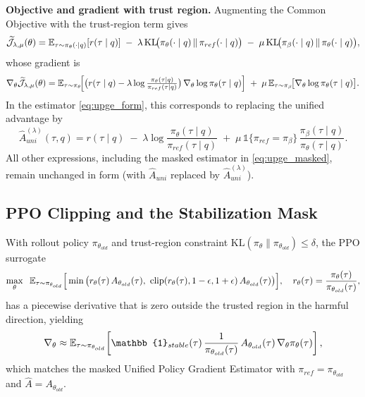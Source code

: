 \medskip
\noindent\textbf{Objective and gradient with trust region.}
Augmenting the Common Objective with the trust-region term gives
\[
\widetilde{\mathcal{J}}_{\lambda,\mu}(\theta)
=
\mathbb{E}_{\tau\sim \pi_\theta(\cdot\mid q)}[r(\tau\mid q)]
\;-\;
\lambda\,\mathrm{KL}\!\big(\pi_\theta(\cdot\mid q)\,\|\,\pi_{ref}(\cdot\mid q)\big)
\;-\;
\mu\,\mathrm{KL}\!\big(\pi_\beta(\cdot\mid q)\,\|\,\pi_\theta(\cdot\mid q)\big),
\]
whose gradient is
\[
\nabla_\theta \widetilde{\mathcal{J}}_{\lambda,\mu}(\theta)
=
\mathbb{E}_{\tau\sim \pi_\theta}\!\Big[\big(r(\tau\mid q)-\lambda \log\tfrac{\pi_\theta(\tau\mid q)}{\pi_{ref}(\tau\mid q)}\big)\,\nabla_\theta \log \pi_\theta(\tau\mid q)\Big]
\;+\;
\mu\,\mathbb{E}_{\tau\sim \pi_\beta}\!\big[\nabla_\theta \log \pi_\theta(\tau\mid q)\big].
\]
In the estimator \eqref{eq:upge_form}, this corresponds to replacing the unified advantage by
\[
\widehat{A}_{uni}^{(\lambda)}(\tau,q)
=
r(\tau\mid q)
\;-\;\lambda \log \frac{\pi_\theta(\tau\mid q)}{\pi_{ref}(\tau\mid q)}
\;+\;
\mu\,\mathbb{1}\{\pi_{ref}=\pi_\beta\}\,\frac{\pi_\beta(\tau\mid q)}{\pi_\theta(\tau\mid q)}.
\]
All other expressions, including the masked estimator in \eqref{eq:upge_masked}, remain unchanged in form (with $\widehat{A}_{uni}$ replaced by $\widehat{A}_{uni}^{(\lambda)}$).

\subsection{PPO Clipping and the Stabilization Mask}
\label{app:ppo-mask-subsec}

With rollout policy $\pi_{\theta_{old}}$ and trust-region constraint $\mathrm{KL}(\pi_\theta\|\pi_{\theta_{old}})\le \delta$, the PPO surrogate
\[
\max_{\theta}\;\;
\E_{\tau\sim \pi_{\theta_{old}}}\Big[\min\big(r_\theta(\tau)\,A_{\theta_{old}}(\tau),\ \mathrm{clip}(r_\theta(\tau),1-\epsilon,1+\epsilon)\,A_{\theta_{old}}(\tau)\big)\Big],
\quad
r_\theta(\tau)=\frac{\pi_\theta(\tau)}{\pi_{\theta_{old}}(\tau)},
\]
has a piecewise derivative that is zero outside the trusted region in the harmful direction, yielding
\begin{equation}
\label{eq:ppo_mask_app}
\nabla_\theta
\approx
\E_{\tau\sim \pi_{\theta_{old}}}
\!\left[
\mathbb{1}_{stable}(\tau)\,
\frac{1}{\pi_{\theta_{old}}(\tau)}\,
A_{\theta_{old}}(\tau)\,
\nabla_\theta \pi_\theta(\tau)
\right],
\end{equation}
which matches the masked Unified Policy Gradient Estimator with $\pi_{ref}=\pi_{\theta_{old}}$ and $\widehat{A}=A_{\theta_{old}}$.




